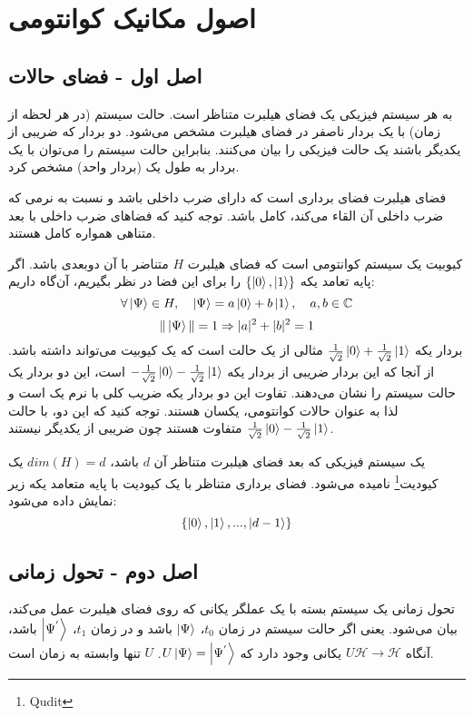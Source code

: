   \section{اصول مکانیک کوانتومی}
  \subsection{اصل اول - فضای حالات}
 به هر سیستم فیزیکی یک فضای هیلبرت متناظر است. حالت  سیستم (در هر لحظه از زمان)
با یک بردار ناصفر در فضای هیلبرت مشخص می‌شود. دو بردار که ضریبی از یکدیگر باشند یک حالت
فیزیکی را بیان می‌کنند. بنابراین حالت سیستم را می‌توان با یک بردار به طول یک (بردار واحد) مشخص
کرد.

فضای هیلبرت فضای برداری است که دارای ضرب داخلی باشد و نسبت به نرمی که ضرب داخلی آن القاء می‌کند، کامل باشد. توجه کنید که فضاهای ضرب داخلی با بعد متناهی همواره کامل هستند.

\begin{example}
کیوبیت یک سیستم کوانتومی است که فضای هیلبرت $H$ متناضر با آن دوبعدی باشد. اگر پایه تعامد یکه $\{\ket{0},\ket{1}\}$ را برای این فضا در نظر بگیریم، آن‌گاه داریم:
\begin{equation}
	\forall \ket{\Psi} \in H, \quad \ket{\Psi} = a\ket{0} + b\ket{1}, \quad a,b \in \mathbb{C}
\end{equation}   
\begin{equation}
	\| \ket{\Psi} \| = 1 \Rightarrow |a|^{2} + |b|^{2} = 1
\end{equation}   
بردار یکه $\frac{1}{\sqrt{2}}\ket{0} + \frac{1}{\sqrt{2}}\ket{1}$ مثالی از یک حالت است که یک کیوبیت می‌تواند داشته باشد. از آنجا که این بردار ضریبی از بردار یکه $-\frac{1}{\sqrt{2}}\ket{0} - \frac{1}{\sqrt{2}}\ket{1}$ است، این دو بردار یک حالت سیستم را نشان می‌دهند. تفاوت این دو بردار یکه ضریب کلی با نرم یک است و لذا به عنوان حالات کوانتومی، یکسان هستند. توجه کنید که این دو، با حالت $\frac{1}{\sqrt{2}}\ket{0} - \frac{1}{\sqrt{2}}\ket{1}$ متفاوت هستند چون ضریبی از یکدیگر نیستند.
\end{example}

 یک سیستم فیزیکی که بعد فضای هیلبرت متناظر آن $d$ باشد، $dim(H) = d$ یک کیودیت\footnote{Qudit} نامیده می‌شود. فضای برداری متناظر با یک کیودیت با پایه متعامد یکه زیر نمایش داده می‌شود:
  \begin{equation}
  \{ \ket{0}, \ket{1}, ... , \ket{d-1} \}
  \end{equation}
  
  \subsection{اصل دوم - تحول زمانی}
  تحول زمانی یک سیستم بسته با یک عملگر یکانی که روی فضای هیلبرت عمل می‌کند، بیان می‌شود. یعنی اگر حالت سیستم در زمان $t_{0}$، $\ket{\Psi}$ باشد و در زمان $t_{1}$، $\ket{\Psi^{'}}$ باشد، آنگاه $U \mathcal{H} \to \mathcal{H}$  یکانی وجود دارد که $U\ket{\Psi} = \ket{\Psi^{'}}$. $U$ تنها وابسته به زمان است. 
  
